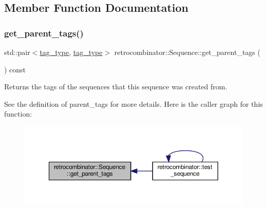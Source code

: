 \subsection{Member Function Documentation}
\mbox{\label{classretrocombinator_1_1Sequence_abd985b5164277d63c40f9580882335c8}} 
\subsubsection{\texorpdfstring{get\+\_\+parent\+\_\+tags()}{get\_parent\_tags()}}
{\footnotesize\ttfamily std\+::pair$<$\hyperlink{constants_8h_afd7c6eb4293e8c4d12827609a9a34b9b}{tag\+\_\+type}, \hyperlink{constants_8h_afd7c6eb4293e8c4d12827609a9a34b9b}{tag\+\_\+type}$>$ retrocombinator\+::\+Sequence\+::get\+\_\+parent\+\_\+tags (\begin{DoxyParamCaption}{ }\end{DoxyParamCaption}) const\hspace{0.3cm}{\ttfamily [inline]}}



Returns the tags of the sequences that this sequence was created from. 

See the definition of parent\+\_\+tags for more details. Here is the caller graph for this function\+:
\nopagebreak
\begin{figure}[H]
\begin{center}
\leavevmode
\includegraphics[width=350pt]{classretrocombinator_1_1Sequence_abd985b5164277d63c40f9580882335c8_icgraph}
\end{center}
\end{figure}
\mbox{\label{classretrocombinator_1_1Sequence_a445120376c2e5c626d3ecfa509406843}} 
